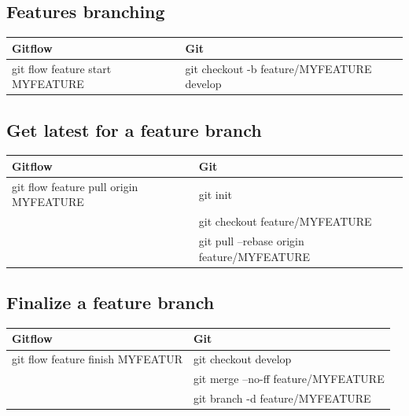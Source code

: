 \documentclass{tufte-handout}
\begin{document}
		\subsection{Features branching}
		
		\begin{table}[ht]
			\centering
			\selectfont
			\begin{tabular}{ll}
				\toprule
				Gitflow & Git \\
				\midrule
				git flow feature start MYFEATURE & git checkout -b feature/MYFEATURE develop \\
				\bottomrule
			\end{tabular}
			\label{tab:normaltab}
		\end{table}
		\medskip %
		
		\clearpage
	
		\subsection{Get latest for a feature branch}
		
		\begin{table}[ht]
			\centering
			\selectfont
			\begin{tabular}{ll}
				\toprule
				Gitflow & Git \\
				\midrule
				git flow feature pull origin MYFEATURE & git init \\
				& git checkout feature/MYFEATURE \\
				& git pull --rebase origin feature/MYFEATURE \\
				\bottomrule
			\end{tabular}
			\label{tab:normaltab}
		\end{table}
		\medskip %
		
		\subsection{Finalize a feature branch}
		
		\begin{table}[ht]
			\centering
			\selectfont
			\begin{tabular}{ll}
				\toprule
				Gitflow & Git \\
				\midrule
				git flow feature finish MYFEATUR & git checkout develop \\
				& git merge --no-ff feature/MYFEATURE \\
				& git branch -d feature/MYFEATURE \\
				\bottomrule
			\end{tabular}
			\label{tab:normaltab}
		\end{table}
		\medskip %
		
\end{document}

